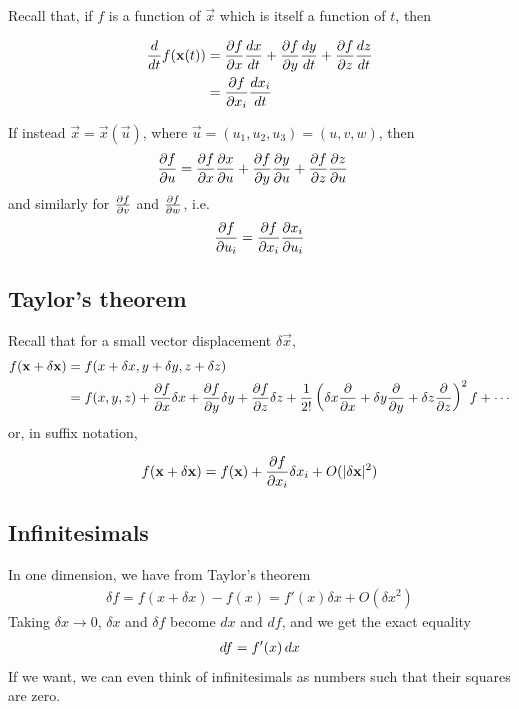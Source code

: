\documentclass{../../template/note}
\begin{document}
    Recall that, if \(f\) is a function of \(\vec x\) which is itself a function of \(t\), then
    \begin{proposition}
        \begin{align*}
            \frac{d}{dt} f(\vec x(t)) &= \pd{f}{x} \frac{dx}{dt} + \pd{f}{y} \frac{dy}{dt} + \pd{f}{z} \frac{dz}{dt} \\
            &= \pd {f}{x_i} \frac{dx_i}{dt}
        \end{align*} \label{1.1}
    \end{proposition}
    
    
    If instead \(\vec x = \vec x(\vec u)\), where \(\vec u = (u_1, u_2, u_3) = (u, v, w)\), then
    \begin{align*}
        \pd{f}{u} &= \pd{f}{x} \pd{x}{u} + \pd{f}{y} \pd{y}{u} + \pd{f}{z} \pd{z}{u}
    \end{align*}
    and similarly for \(\pd{f}{v}\) and \(\pd{f}{w}\), i.e.
    \begin{align*}
        \pd {f}{u_i} = \pd {f}{x_i} \pd {x_i}{u_i}
    \end{align*}
    
    \subsection{Taylor's theorem}

    Recall that for a small vector displacement \(\delta \vec x\),
    \begin{align*}
        f(\vec x + \delta \vec x) &= f(x + \delta x, y + \delta y, z + \delta z) \\
        &= f(x, y, z) + \pd f x \delta x + \pd f y \delta y + \pd f z \delta z + \frac{1}{2!} \left(\delta x \pd{}{x} + \delta y \pd{}{y} + \delta z \pd {}{z}\right)^2f + \cdots
    \end{align*}
    or, in suffix notation,
    \begin{proposition}
        \label{1.2} \[
            f(\vec x + \delta \vec x) = f(\vec x) + \pd{f}{x_i} \delta x_i + O(|\delta \vec x|^2)
        \]
    \end{proposition}
    
    
    
    
    \subsection{Infinitesimals}
    
    In one dimension, we have from Taylor's theorem
    \begin{align*}
        \delta f = f(x + \delta x) - f(x) = f'(x) \delta x + O(\delta x^2)
    \end{align*}
    Taking \(\delta x \to 0\), \(\delta x\) and \(\delta f\) become \(dx\) and \(df\), and we get the exact equality
    \begin{align*}
        df = f'(x) \,d{x}
    \end{align*}
    If we want, we can even think of infinitesimals as numbers such that their squares are zero.
\end{document}
